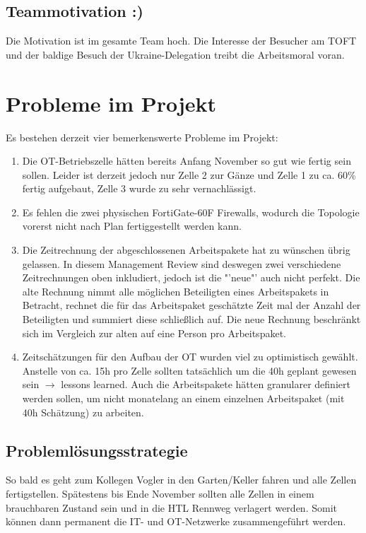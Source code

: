 \documentclass[
	headings=optiontotocandhead,%
	oneside,
	numbers=noenddot,%
	toc=flat, %
	10pt, %
	parskip=full, %
	listof=totoc, %
	listof=flat, %
	numbers=noenddot, %
	bibliography=totoc, %
	a4paper,DIV=14,
]{scrartcl}
\begin{document}
\subsection{Teammotivation \colorbox{green!30}{:)}} 
Die Motivation ist im gesamte Team hoch. Die Interesse der Besucher am TOFT und der baldige Besuch der Ukraine-Delegation treibt die Arbeitsmoral voran.

\section{Probleme im Projekt}
Es bestehen derzeit vier bemerkenswerte Probleme im Projekt:
\begin{enumerate}
	\item Die OT-Betriebszelle hätten bereits Anfang November so gut wie fertig sein sollen. Leider ist derzeit jedoch nur Zelle 2 zur Gänze und Zelle 1 zu ca. 60\% fertig aufgebaut, Zelle 3 wurde zu sehr vernachlässigt.
	\item Es fehlen die zwei physischen FortiGate-60F Firewalls, wodurch die Topologie vorerst nicht nach Plan fertiggestellt werden kann.
	\item Die Zeitrechnung der abgeschlossenen Arbeitspakete hat zu wünschen übrig gelassen. In diesem Management Review sind deswegen zwei verschiedene Zeitrechnungen oben inkludiert, jedoch ist die "'neue"' auch nicht perfekt. Die alte Rechnung nimmt alle möglichen Beteiligten eines Arbeitspakets in Betracht, rechnet die für das Arbeitspaket geschätzte Zeit mal der Anzahl der Beteiligten und summiert diese schließlich auf. Die neue Rechnung beschränkt sich im Vergleich zur alten auf eine Person pro Arbeitspaket.
	\item Zeitschätzungen für den Aufbau der OT wurden viel zu optimistisch gewählt. Anstelle von ca. 15h pro Zelle sollten tatsächlich um die 40h geplant gewesen sein $\rightarrow$ lessons learned. Auch die Arbeitspakete hätten granularer definiert werden sollen, um nicht monatelang an einem einzelnen Arbeitspaket (mit 40h Schätzung) zu arbeiten.
\end{enumerate}

\subsection{Problemlösungsstrategie}
So bald es geht zum Kollegen Vogler in den Garten/Keller fahren und alle Zellen fertigstellen. Spätestens bis Ende November sollten alle Zellen in einem brauchbaren Zustand sein und in die HTL Rennweg verlagert werden. Somit können dann permanent die IT- und OT-Netzwerke zusammengeführt werden.
\end{document}
